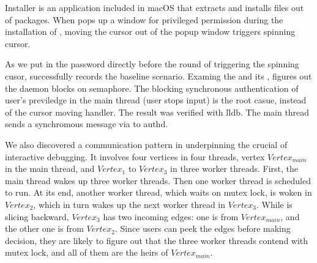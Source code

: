Installer is an application included in macOS that extracts and installs
files out of  packages. When  pops up a window for
privileged permission during the installation of ,
moving the cursor out of the popup window triggers spinning cursor.

As we put in the password directly before the round of triggering the
spinning cusor, \xxx successfully records the baseline scenario. Examing
the \spinningnode and its \similarnode, \xxx figures out the daemon
 blocks on semaphore. The blocking synchronous authentication
of user's previledge in the main thread (user stops input) is the root
casue, instead of the cursor moving handler. The result was verified with
\v{lldb}. The main thread sends a synchromous message via  to authd.


We also discovered a communication pattern in  underpinning the
crucial of interactive debugging. It involves four vertices in four threads,
vertex $Vertex_{main}$ in the main thread, and $Vertex_1$ to $Vertex_3$ in
three worker threads. First, the main thread wakes up three worker threads.
Then one worker thread is scheduled to run. At its end, another worker thread,
which waits on mutex lock, is woken in $Vertex_2$, which in turn wakes up the
next worker thread in $Vertex_3$. While \xxx is slicing backward, $Vertex_3$
has two incoming edges: one is from $Vertex_{main}$, and the other one is from
$Vertex_2$. Since users can peek the edges before making decision, they are
likely to figure out that the three worker threads contend with mutex lock, and
all of them are the heirs of $Vertex_{main}$.
